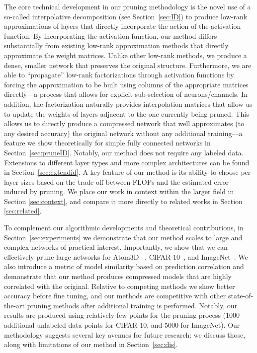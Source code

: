 The core technical development in our pruning methodology is the novel use of a so-called interpolative decomposition (see Section~\ref{sec:ID}) to produce low-rank approximations of layers that directly incorporate the action of the activation function. 
By incorporating the activation function, our method differs substantially from existing low-rank approximation methods that directly approximate the weight matrices.  
Unlike other low-rank methods, we produce a dense, smaller network that preserves the original structure.
Furthermore, we are able to ``propagate'' low-rank factorizations through activation functions by forcing the approximation to be built using columns of the appropriate matrices directly---a process that allows for explicit sub-selection of neurons/channels.
In addition, the factorization naturally provides interpolation matrices that allow us to update the weights of layers adjacent to the one currently being pruned. This allows us to directly produce a compressed network that well approximates (to any desired accuracy) the original network without any additional training---a feature we show theoretically for simple fully connected networks in Section~\ref{sec:pruneID}.  Notably, our method does not require any labeled data.
Extensions to different layer types and more complex architectures can be found in Section~\ref{sec:extendid}. A key feature of our method is its ability to choose per-layer sizes based on the trade-off between FLOPs and the estimated error induced by pruning. We place our work in context within the larger field in Section \ref{sec:context}, and compare it more directly to related works in Section \ref{sec:related}.  

To complement our algorithmic developments and theoretical contributions, in Section~\ref{sec:experiments} we demonstrate that our method scales to large and complex networks of practical interest.  Importantly, we show that we can effectively prune large networks for Atom3D~\cite{atom3d}
, CIFAR-10~\cite{datacifar10}, and ImageNet~\cite{deng2009imagenet}. 
We also introduce a metric of model similarity based on prediction correlation and demonstrate that our method produces compressed models that are highly correlated with the original.  
Relative to competing methods we show better accuracy before fine tuning, and our methods are competitive with other state-of-the-art pruning methods after additional training is performed. Notably, our results are produced using relatively few points for the pruning process (1000 additional unlabeled data points for CIFAR-10, and 5000 for ImageNet). Our methodology suggests several key avenues for future research: we discuss those, along with limitations of our method in Section~\ref{sec:dis}.

